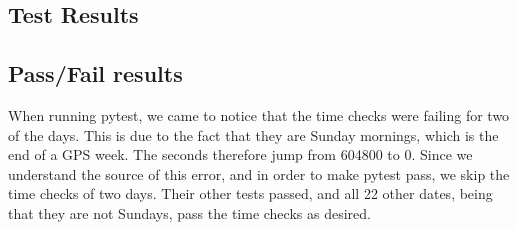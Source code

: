 \subsection{Test Results}
\subsection{Pass/Fail results}

When running pytest, we came to notice that the time checks were failing for two of the days. This is due to the fact that they are Sunday mornings, which is the end of a GPS week. The seconds therefore jump from 604800 to 0. Since we understand the source of this error, and in order to make pytest pass, we skip the time checks of two days. Their other tests passed, and all 22 other dates, being that they are not Sundays, pass the time checks as desired. 


